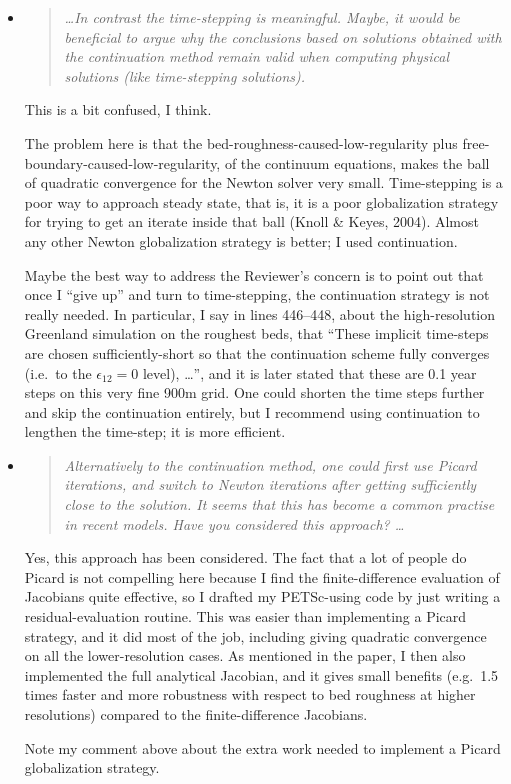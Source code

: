 \documentclass[11pt,reqno]{amsart}
\newcommand{\reply}[2]{
\medskip\medskip
\item  \begin{quote}
\emph{#1}
\end{quote}

\medskip
\noindent #2}
\begin{document}
\begin{itemize}
\reply{\dots  In contrast the time-stepping is meaningful.  Maybe,
it would be beneficial to argue why the conclusions based on solutions obtained
with the continuation method remain valid when computing physical solutions
(like time-stepping solutions).}
{This is a bit confused, I think.

The problem here is that the bed-roughness-caused-low-regularity plus free-boundary-caused-low-regularity, of the continuum equations, makes the ball of quadratic convergence for the Newton solver very small.  Time-stepping is a poor way to approach steady state, that is, it is a poor globalization strategy for trying to get an iterate inside that ball (Knoll \& Keyes, 2004).  Almost any other Newton globalization strategy is better; I used continuation.

Maybe the best way to address the Reviewer's concern is to point out that once I ``give up'' and turn to time-stepping, the continuation strategy is not really needed.  In particular, I say in lines 446--448, about the high-resolution Greenland simulation on the roughest beds, that ``These implicit time-steps are chosen sufficiently-short so that the continuation scheme fully converges (i.e.~to the $\epsilon_{12}=0$ level), \dots'', and it is later stated that these are 0.1 year steps on this very fine 900m grid.  One could shorten the time steps further and skip the continuation entirely, but I recommend using continuation to lengthen the time-step; it is more efficient.}

\reply{Alternatively to the continuation method, one could first use Picard iterations,
and switch to Newton iterations after getting sufficiently close to the solution.
It seems that this has become a common practise in recent models. Have you
considered this approach?  \dots}
{Yes, this approach has been considered.  The fact that a lot of people do Picard is not compelling here because I find the finite-difference evaluation of Jacobians quite effective, so I drafted my PETSc-using code by just writing a residual-evaluation routine.  This was easier than implementing a Picard strategy, and it did most of the job, including giving quadratic convergence on all the lower-resolution cases.  As mentioned in the paper, I then also implemented the full analytical Jacobian, and it gives small benefits (e.g.~1.5 times faster and more robustness with respect to bed roughness at higher resolutions) compared to the finite-difference Jacobians.

Note my comment above about the extra work needed to implement a Picard globalization strategy.}


\end{itemize}
\end{document}
